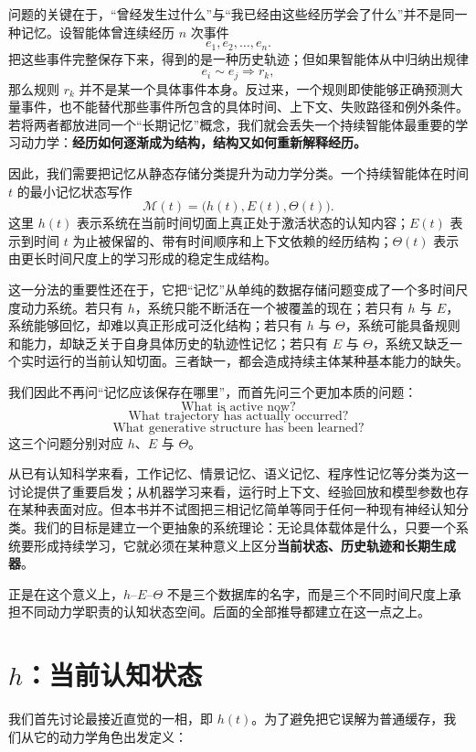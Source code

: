 问题的关键在于，“曾经发生过什么”与“我已经由这些经历学会了什么”并不是同一种记忆。设智能体曾连续经历 $n$ 次事件
\[
e_1,e_2,\ldots,e_n.
\]
把这些事件完整保存下来，得到的是一种历史轨迹；但如果智能体从中归纳出规律
\[
e_i \sim e_j
\Longrightarrow
r_k,
\]
那么规则 $r_k$ 并不是某一个具体事件本身。反过来，一个规则即使能够正确预测大量事件，也不能替代那些事件所包含的具体时间、上下文、失败路径和例外条件。若将两者都放进同一个“长期记忆”概念，我们就会丢失一个持续智能体最重要的学习动力学：\textbf{经历如何逐渐成为结构，结构又如何重新解释经历。}

因此，我们需要把记忆从静态存储分类提升为动力学分类。一个持续智能体在时间 $t$ 的最小记忆状态写作
\[
\mathcal{M}(t)
=
\bigl(
h(t),E(t),\Theta(t)
\bigr).
\]
这里 $h(t)$ 表示系统在当前时间切面上真正处于激活状态的认知内容；$E(t)$ 表示到时间 $t$ 为止被保留的、带有时间顺序和上下文依赖的经历结构；$\Theta(t)$ 表示由更长时间尺度上的学习形成的稳定生成结构。

这一分法的重要性还在于，它把“记忆”从单纯的数据存储问题变成了一个多时间尺度动力系统。若只有 $h$，系统只能不断活在一个被覆盖的现在；若只有 $h$ 与 $E$，系统能够回忆，却难以真正形成可泛化结构；若只有 $h$ 与 $\Theta$，系统可能具备规则和能力，却缺乏关于自身具体历史的轨迹性记忆；若只有 $E$ 与 $\Theta$，系统又缺乏一个实时运行的当前认知切面。三者缺一，都会造成持续主体某种基本能力的缺失。

我们因此不再问“记忆应该保存在哪里”，而首先问三个更加本质的问题：
\[
\text{What is active now?}
\]
\[
\text{What trajectory has actually occurred?}
\]
\[
\text{What generative structure has been learned?}
\]
这三个问题分别对应 $h$、$E$ 与 $\Theta$。

从已有认知科学来看，工作记忆、情景记忆、语义记忆、程序性记忆等分类为这一讨论提供了重要启发；从机器学习来看，运行时上下文、经验回放和模型参数也存在某种表面对应。但本书并不试图把三相记忆简单等同于任何一种现有神经认知分类。我们的目标是建立一个更抽象的系统理论：无论具体载体是什么，只要一个系统要形成持续学习，它就必须在某种意义上区分\textbf{当前状态、历史轨迹和长期生成器}。

正是在这个意义上，$h$--$E$--$\Theta$ 不是三个数据库的名字，而是三个不同时间尺度上承担不同动力学职责的认知状态空间。后面的全部推导都建立在这一点之上。

\section{$h$：当前认知状态}

我们首先讨论最接近直觉的一相，即 $h(t)$。为了避免把它误解为普通缓存，我们从它的动力学角色出发定义：
\begin{statementbox}
\centering
{}
\end{statementbox}

